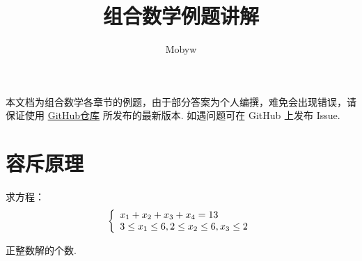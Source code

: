 \documentclass[cn, hazy, blue, normal, 12pt]{elegantnote}
\title{组合数学例题讲解}
\author{Mobyw}
\date{\zhtoday}
\begin{document}
\maketitle


\doclicenseThis

本文档为组合数学各章节的例题，由于部分答案为个人编撰，难免会出现错误，请保证使用 \href{https://github.com/mobyw/MasterCourseNotes/blob/master/CombinatorialMathematics/CombinatorialMathematicsExamples.pdf}{GitHub仓库} 所发布的最新版本. 如遇问题可在 GitHub 上发布 Issue.


\section{容斥原理}

\begin{exercise}

    求方程：
    \begin{equation}
        \notag
        \left\{\begin{array}{l}
            x_{1}+x_{2}+x_{3}+x_{4}=13 \\
            3 \leq x_{1} \leq 6, 2 \leq x_{2} \leq 6, x_{3} \leq 2
        \end{array}\right.
    \end{equation}

    正整数解的个数.

\end{exercise}
\end{document}
